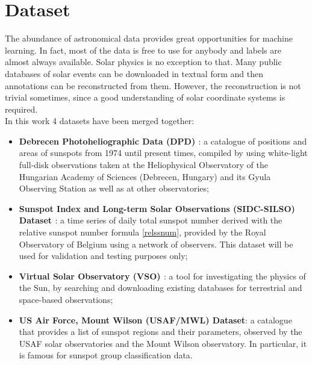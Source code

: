 \chapter{Dataset}
\label{capitolo6}
\thispagestyle{empty}
\noindent The abundance of astronomical data provides great opportunities for machine learning. In fact, most of the data is free to use for anybody and labels are almost always available. Solar physics is no exception to that. Many public databases of solar events can be downloaded in textual form and then annotations can be reconstructed from them. However, the reconstruction is not trivial sometimes, since a good understanding of solar coordinate systems is required.\\
In this work 4 datasets have been merged together:
\begin{itemize}
  \item \textbf{Debrecen Photoheliographic Data (DPD) \cite{baranyi2016line}\cite{gyHori2016comparative}}: a catalogue of positions and areas of sunspots from 1974 until present times, compiled by using white-light full-disk observations taken at the Heliophysical Observatory of the Hungarian Academy of Sciences (Debrecen, Hungary) and its Gyula Observing Station as well as at other observatories;
  \item \textbf{Sunspot Index and Long-term Solar Observations (SIDC-SILSO) Dataset \cite{clette2014revisiting}}: a time series of daily total sunspot number derived with the relative sunspot number formula \eqref{relssnum}, provided by the Royal Observatory of Belgium using a network of observers. This dataset will be used for validation and testing purposes only;
  \item \textbf{Virtual Solar Observatory (VSO) \cite{hill2009virtual}}: a tool for investigating the physics of the Sun, by searching and downloading existing databases for terrestrial and space-based observations;
  \item \textbf{US Air Force, Mount Wilson (USAF/MWL) Dataset}: a catalogue that provides a list of sunspot regions and their parameters, observed by the USAF solar observatories and the Mount Wilson observatory. In particular, it is famous for sunspot group classification data.
\end{itemize}
